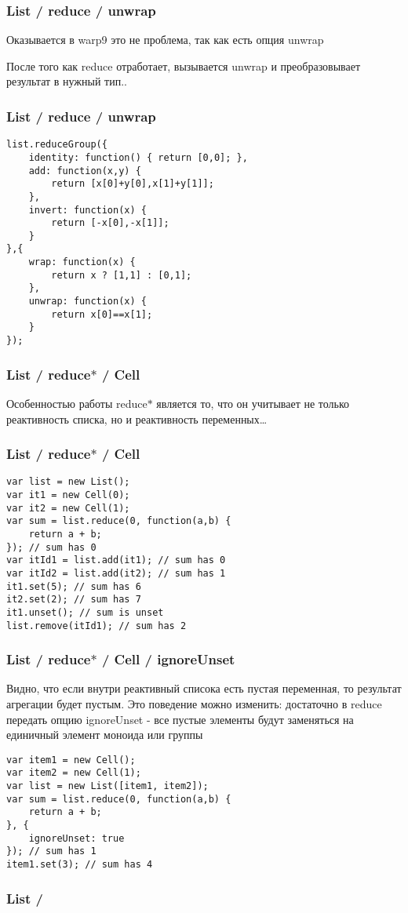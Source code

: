 \documentclass[xetex]{beamer}
\begin{document}
\begin{frame}[fragile]
\frametitle{List / reduce / unwrap}
Оказывается в warp9 это не проблема, так как есть опция unwrap

\vspace{10mm}

После того как reduce отработает, вызывается unwrap и преобразовывает результат в нужный тип..
\end{frame}


\begin{frame}[fragile]
\frametitle{List / reduce / unwrap}
\begin{lstlisting}[frame=none, xleftmargin=.01\textwidth]
list.reduceGroup({
    identity: function() { return [0,0]; },
    add: function(x,y) { 
        return [x[0]+y[0],x[1]+y[1]]; 
    },
    invert: function(x) { 
        return [-x[0],-x[1]]; 
    }
},{
    wrap: function(x) { 
        return x ? [1,1] : [0,1]; 
    },
    unwrap: function(x) { 
        return x[0]==x[1]; 
    }
});
\end{lstlisting}
\end{frame}


\begin{frame}[fragile]
\frametitle{List / reduce$\ast$ / Cell}
Особенностью работы reduce$\ast$ является то, что он учитывает не только реактивность списка, но и реактивность переменных\dots
\end{frame}


\begin{frame}[fragile]
\frametitle{List / reduce$\ast$ / Cell}
\begin{lstlisting}
var list = new List();
var it1 = new Cell(0);
var it2 = new Cell(1);
var sum = list.reduce(0, function(a,b) { 
    return a + b; 
}); // sum has 0
var itId1 = list.add(it1); // sum has 0
var itId2 = list.add(it2); // sum has 1
it1.set(5); // sum has 6
it2.set(2); // sum has 7
it1.unset(); // sum is unset
list.remove(itId1); // sum has 2
\end{lstlisting}
\end{frame}


\begin{frame}[fragile]
\frametitle{List / reduce$\ast$ / Cell / ignoreUnset}
Видно, что если внутри реактивный списока есть пустая переменная, то результат агрегации будет пустым. Это поведение можно изменить:  достаточно в reduce передать опцию ignoreUnset - все пустые элементы будут заменяться на единичный элемент моноида или группы
\begin{lstlisting}[frame=none]
var item1 = new Cell();
var item2 = new Cell(1);
var list = new List([item1, item2]);
var sum = list.reduce(0, function(a,b) { 
    return a + b; 
}, {
    ignoreUnset: true
}); // sum has 1 
item1.set(3); // sum has 4
\end{lstlisting}
\end{frame}


\begin{frame}[fragile]
\frametitle{List / }

\vspace{10mm}
\begin{lstlisting}
\end{lstlisting}
\end{frame}
\end{document}
